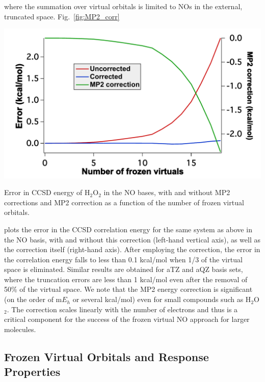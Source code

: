 where the summation over virtual orbitals is limited to NOs in the external,
truncated space.  Fig.~\ref{fig:MP2_corr} 
\begin{MyFigure}[h!]
\centering
\includegraphics[width=0.6\linewidth,natwidth=610,natheight=642]{figures_fvno/Mp2c.pdf}
\caption{{\footnotesize Error in CCSD energy of H$_2$O$_2$ in the NO bases, with and without MP2 corrections
        and MP2 correction as a function of the number of frozen virtual orbitals.}}
\label{fig:MP2_corr}
\end{MyFigure}
plots the error in the CCSD correlation energy for the same system as above in the NO basis, with and
without this correction (left-hand vertical axis), as well as the correction
itself (right-hand axis).  After employing the correction, the error in the
correlation energy falls to less than 0.1 kcal/mol when 1/3 of the virtual
space is eliminated. Similar results are obtained for aTZ and aQZ basis sets,
where the truncation errors are less than 1 kcal/mol even after the removal of 50\%
of the virtual space. We note that the MP2 energy correction is significant 
(on the order of m$E_h$ or several kcal/mol) even for small compounds such as 
H$_2$O$_2$.  The correction scales linearly with the number of electrons and 
thus is a critical component for the success of the frozen virtual NO approach 
for larger molecules.

\subsection{Frozen Virtual Orbitals and Response Properties}

